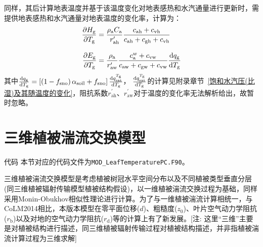 同样，其后计算地表温度并基于该温度变化对地表感热和水汽通量进行更新时，需提供地表感热和水汽通量对地表温度的变化率，计算为：
\begin{align}
  \frac{\partial H_{\mathrm{g}}}{\partial T_{\mathrm{g}}} & = \frac{\rho_{\mathrm{a}} C_{\mathrm{a}}}{r_{\mathrm{a h}}^{\prime}}
  \frac{c_{\mathrm{ah}}+c_{\mathrm{vh}}}{c_{\mathrm{ah}}+c_{\mathrm{gh}}+c_{\mathrm{vh}}} \\[2ex]
%
  \frac{\partial E_{\mathrm{g}}}{\partial T_{\mathrm{g}}} & =
  \frac{\rho_{\mathrm{a}}}{r_{\mathrm{a w}}^{\prime}} \frac{c_{\mathrm{a}}^{w}+c_{\mathrm{vw}}}{c_{\mathrm{aw}}+c_{\mathrm{gw}}+c_{\mathrm{vw}}} \frac{{\rm d} q_{\mathrm{g}}}{{\rm d} T_{\mathrm{g}}}\label{Eg/Tg_2}
\end{align}
其中$\frac{{\rm d}q_{\mathrm {g}}}{{\rm d}T_{\mathrm {g}}}=\left[\left(1-f_{\mathrm{sno}}\right)\alpha_{\mathrm{soil}}+f_{\mathrm{sno}}\right]\frac{{\rm d}q_{\mathrm{sat}}^{T_{\mathrm {g}}}}{{\rm d}T_{\mathrm {g}}}$，
$\frac{{\rm d}q_{\mathrm{sat}}^{T_{\mathrm {g}}}}{{\rm d}T_{\mathrm {g}}}$的计算见附录章节~\ref{饱和水汽压(比湿)及其随温度的变化}，阻抗系数$r_{\mathrm{ah}}^\prime$、$r_{\mathrm{aw}}^\prime$对于温度的变化率无法解析给出，故暂时忽略。


\section{三维植被湍流交换模型}\label{三维植被湍流}
\begin{mymdframed}{代码}
  本节对应的代码文件为\texttt{MOD\_LeafTemperaturePC.F90}。
\end{mymdframed}

三维植被湍流交换模型是考虑植被树冠水平空间分布以及不同植被类型垂直分层(同三维植被辐射传输模型植被结构假设)，以一维植被湍流交换过程为基础，同样采用Monin-Obukhov相似性理论进行计算。为了与一维植被湍流计算相统一，与CoLM2014相比，本版本模型在零平面位移($d$)、粗糙度($z_0$)、叶片空气动力学阻抗($r_{\mathrm {b}}$)以及对地的空气动力学阻抗($r_{\mathrm {d}}$)等的计算上有了新发展。[注: 这里“三维”主要是对植被结构进行描述，同三维植被辐射传输过程对植被结构描述，并非指植被湍流计算过程为三维求解]


